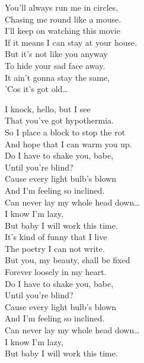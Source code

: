 You'll always run me in circles, \\
Chasing me round like a mouse. \\
I'll keep on watching this movie \\
If it means I can stay at your house. \\
But it's not like you anyway \\
To hide your sad face away. \\
It ain't gonna stay the same, \\
'Cos it's got old… \\





I knock, hello, but I see \\
That you've got hypothermia. \\
So I place a block to stop the rot \\
And hope that I can warm you up. \\

Do I have to shake you, babe, \\
Until you're blind? \\
Cause every light bulb's blown \\
And I'm feeling so inclined. \\

Can never lay my whole head down… \\
I know I'm lazy, \\
But baby I will work this time. \\

It's kind of funny that I live \\
The poetry I can not write. \\
But you, my beauty, shall be fixed \\
Forever loosely in my heart. \\

Do I have to shake you, babe, \\
Until you're blind? \\
Cause every light bulb's blown \\
And I'm feeling so inclined. \\

Can never lay my whole head down… \\
I know I'm lazy, \\
But baby I will work this time. \\

